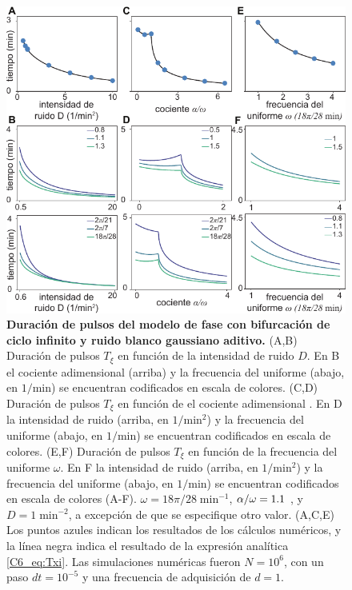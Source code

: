 \documentclass[./main.tex]{subfiles}
\begin{document}
\begin{figure}
    \centering
    \includegraphics[width=1\columnwidth]{figures/chapter6/C6_duration.pdf} 
    \caption{\textbf{Duración de pulsos del modelo de fase con bifurcación de ciclo infinito y ruido blanco gaussiano aditivo.} (A,B) Duración de pulsos $T_\xi$ en función de la intensidad de ruido $D$. En B el cociente adimensional \dddelta (arriba) y la frecuencia del uniforme (abajo, en $1/\text{min}$) se encuentran codificados en escala de colores. (C,D) Duración de pulsos $T_\xi$ en función de el cociente adimensional \dddelta. En D la intensidad de ruido (arriba, en $1/\text{min}^2$) y la frecuencia del uniforme (abajo, en $1/\text{min}$) se encuentran codificados en escala de colores. (E,F) Duración de pulsos $T_\xi$ en función de la frecuencia del uniforme $\omega$. En F la intensidad de ruido (arriba, en $1/\text{min}^2$) y la frecuencia del uniforme (abajo, en $1/\text{min}$) se encuentran codificados en escala de colores (A-F). $\omega = 18\pi/28 \;\text{min}^{-1}$, $\alpha/\omega = 1.1$ , y $D = 1 \;\text{min}^{-2}$, a excepción de que se especifique otro valor. (A,C,E)  Los puntos azules indican los resultados de los cálculos numéricos, y la línea negra indica el resultado de la expresión analítica \ref{C6_eq:Txi}. Las simulaciones numéricas fueron $N=10^6$, con un paso $dt = 10^{-5}$ y una frecuencia de adquisición de $d=1$.}
    \label{C6_fig:duration}
\end{figure}
\end{document}
